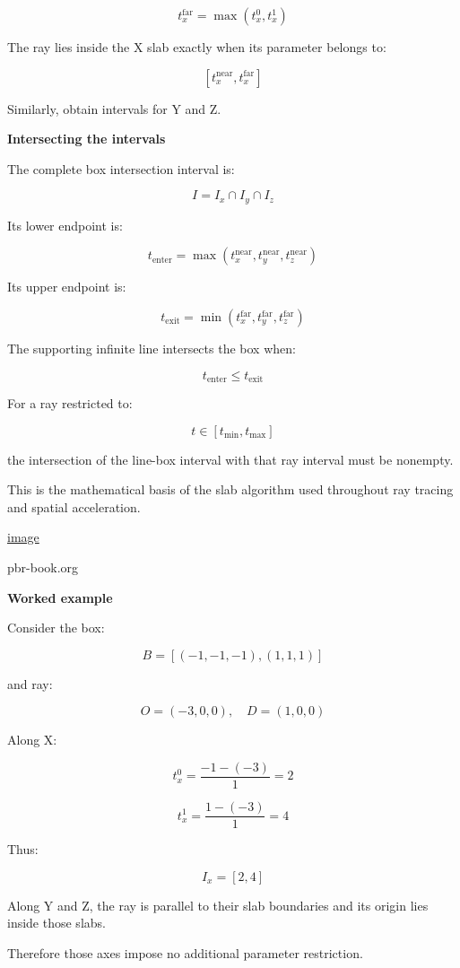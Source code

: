 \[
\boxed{ t_x^{\mathrm{far}}=\max(t_x^0,t_x^1) }
\]

The ray lies inside the X slab exactly when its parameter belongs to:

\[
[t_x^{\mathrm{near}},t_x^{\mathrm{far}}]
\]

Similarly, obtain intervals for Y and Z.

\textbf{Intersecting the intervals}

The complete box intersection interval is:

\[
I=I_x\cap I_y\cap I_z
\]

Its lower endpoint is:

\[
\boxed{ t_{\mathrm{enter}}= \max(t_x^{\mathrm{near}},t_y^{\mathrm{near}},t_z^{\mathrm{near}}) }
\]

Its upper endpoint is:

\[
\boxed{ t_{\mathrm{exit}}= \min(t_x^{\mathrm{far}},t_y^{\mathrm{far}},t_z^{\mathrm{far}}) }
\]

The supporting infinite line intersects the box when:

\[
\boxed{ t_{\mathrm{enter}}\le t_{\mathrm{exit}} }
\]

For a ray restricted to:

\[
t\in[t_{\min},t_{\max}]
\]

the intersection of the line-box interval with that ray interval must be nonempty.

This is the mathematical basis of the slab algorithm used throughout ray tracing and spatial acceleration. 

\href{https://www.google.com/s2/favicons?domain=https://www.pbr-book.org&sz=32}{image}

pbr-book.org

\textbf{Worked example}

Consider the box:

\[
B=[(-1,-1,-1),(1,1,1)]
\]

and ray:

\[
O=(-3,0,0),\quad D=(1,0,0)
\]

Along X:

\[
t_x^0=\frac{-1-(-3)}1=2
\]

\[
t_x^1=\frac{1-(-3)}1=4
\]

Thus:

\[
I_x=[2,4]
\]

Along Y and Z, the ray is parallel to their slab boundaries and its origin lies inside those slabs.

Therefore those axes impose no additional parameter restriction.

